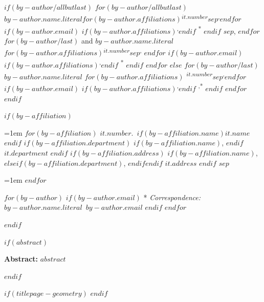 \begin{tcolorbox}

$if(by-author/allbutlast)$
  \noindent\ignorespaces%
  $for(by-author/allbutlast)$
    {\large{$by-author.name.literal$}}$for(by-author.affiliations)${\textsuperscript{$it.number$}}$sep$\textsuperscript{,}$endfor$%
  $if(by-author.email)$%
  $if(by-author.affiliations)$\textsuperscript{,}$endif$%
  {\textsuperscript{*}}%
  $endif$%
  $sep$, 
  $endfor$
  $for(by-author/last)$%
    { and \large{$by-author.name.literal$}}%
  $for(by-author.affiliations)${\textsuperscript{$it.number$}}$sep$\textsuperscript{,}%
  $endfor$%
  $if(by-author.email)$%
    $if(by-author.affiliations)$\textsuperscript{,}$endif$%
    {\textsuperscript{*}}%
  $endif$%
  $endfor$
  $else$
  \noindent\ignorespaces%
  $for(by-author/last)$%
    {\large{$by-author.name.literal$}}%
    $for(by-author.affiliations)$%
    {\textsuperscript{$it.number$}}$sep$\textsuperscript{,}$endfor$%
  $if(by-author.email)$%
    $if(by-author.affiliations)$\textsuperscript{,}$endif$%
    {\textsuperscript{,*}}%
$endif$%
$endfor$
$endif$

$if(by-affiliation)$
\vspace{2\baselineskip} 

\hangindent=1em
$for(by-affiliation)$%
{$it.number$}.~$if(by-affiliation.name)${$it.name$}$endif$%
$if(by-affiliation.department)$%
$if(by-affiliation.name)$, $endif$%
{$it.department$}%
$endif$%
$if(by-affiliation.address)$%
$if(by-affiliation.name)$, $else$$if(by-affiliation.department)$, $endif$$endif$%
{$it.address$}%
$endif$%
$sep$\par\hangindent=1em%
$endfor$

\vspace{1\baselineskip} 

$for(by-author)$
$if(by-author.email)$
* \textit{Correspondence:}~$by-author.name.literal$~$by-author.email$\newline
$endif$
$endfor$

$endif$
\end{tcolorbox}

$if(abstract)$
\begin{tcolorbox}

  \textbf{Abstract:\newline}
  $abstract$

\end{tcolorbox}
$endif$


\vfill

\vspace{1\baselineskip} 

\begin{tcolorbox}
\centering

{
}
\end{tcolorbox}

$if(titlepage-geometry)$
  \restoregeometry
$endif$

